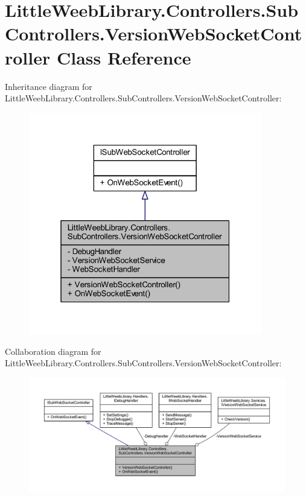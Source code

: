 \hypertarget{class_little_weeb_library_1_1_controllers_1_1_sub_controllers_1_1_version_web_socket_controller}{}\section{Little\+Weeb\+Library.\+Controllers.\+Sub\+Controllers.\+Version\+Web\+Socket\+Controller Class Reference}
\label{class_little_weeb_library_1_1_controllers_1_1_sub_controllers_1_1_version_web_socket_controller}


Inheritance diagram for Little\+Weeb\+Library.\+Controllers.\+Sub\+Controllers.\+Version\+Web\+Socket\+Controller\+:\nopagebreak
\begin{figure}[H]
\begin{center}
\leavevmode
\includegraphics[width=289pt]{class_little_weeb_library_1_1_controllers_1_1_sub_controllers_1_1_version_web_socket_controller__inherit__graph}
\end{center}
\end{figure}


Collaboration diagram for Little\+Weeb\+Library.\+Controllers.\+Sub\+Controllers.\+Version\+Web\+Socket\+Controller\+:\nopagebreak
\begin{figure}[H]
\begin{center}
\leavevmode
\includegraphics[width=350pt]{class_little_weeb_library_1_1_controllers_1_1_sub_controllers_1_1_version_web_socket_controller__coll__graph}
\end{center}
\end{figure}
